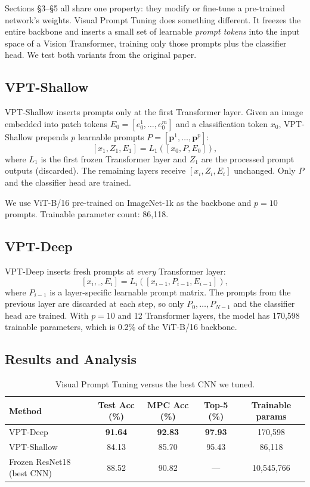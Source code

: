 Sections \S3--\S5 all share one property: they modify or fine-tune a pre-trained network's weights. Visual Prompt Tuning \citep{jia2022vpt} does something different. It freezes the entire backbone and inserts a small set of learnable \emph{prompt tokens} into the input space of a Vision Transformer, training only those prompts plus the classifier head. We test both variants from the original paper.

\subsection{VPT-Shallow}
VPT-Shallow inserts prompts only at the first Transformer layer. Given an image embedded into patch tokens $E_0 = [e_0^1, \dots, e_0^m]$ and a classification token $x_0$, VPT-Shallow prepends $p$ learnable prompts $P = [\mathbf{p}^1, \dots, \mathbf{p}^p]$:
\[
  [x_1, Z_1, E_1] = L_1([x_0, P, E_0]),
\]
where $L_1$ is the first frozen Transformer layer and $Z_1$ are the processed prompt outputs (discarded). The remaining layers receive $[x_i, Z_i, E_i]$ unchanged. Only $P$ and the classifier head are trained.

We use ViT-B/16 pre-trained on ImageNet-1k as the backbone and $p = 10$ prompts. Trainable parameter count: 86,118.

\subsection{VPT-Deep}
VPT-Deep inserts fresh prompts at \emph{every} Transformer layer:
\[
  [x_i, \_, E_i] = L_i([x_{i-1}, P_{i-1}, E_{i-1}]),
\]
where $P_{i-1}$ is a layer-specific learnable prompt matrix. The prompts from the previous layer are discarded at each step, so only $P_0, \dots, P_{N-1}$ and the classifier head are trained. With $p = 10$ and 12 Transformer layers, the model has 170,598 trainable parameters, which is 0.2\% of the ViT-B/16 backbone.

\subsection{Results and Analysis}
\begin{table}[H]
\centering
\small
\begin{tabular}{lcccc}
\toprule
Method & Test Acc (\%) & MPC Acc (\%) & Top-5 (\%) & Trainable params \\
\midrule
VPT-Deep    & \textbf{91.64} & \textbf{92.83} & \textbf{97.93} & 170,598 \\
VPT-Shallow & 84.13 & 85.70 & 95.43 & 86,118 \\
Frozen ResNet18 (best CNN) & 88.52 & 90.82 & --- & 10,545,766 \\
\bottomrule
\end{tabular}
\caption{Visual Prompt Tuning versus the best CNN we tuned.}
\label{tab:vpt-results}
\end{table}


